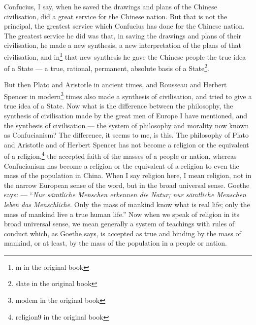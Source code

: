 Confucius, I say, when he saved the drawings and plans of the Chinese civilisation, did a great service for the Chinese nation.
But that is not the principal, the greatest service which Confucius has done for the Chinese nation.
The greatest service he did was that, in saving the drawings and plans of their civilisation, he made a new synthesis, a new interpretation of the plans of that civilisation, and in\footnote{m in the original book} that new synthesis he gave the Chinese people the true idea of a State --- a true, rational, permanent, absolute basis of a State\footnote{slate in the original book}.

But then Plato  and Aristotle  in ancient times, and Rousseau  and Herbert Spencer   in modern\footnote{modem in the original book} times also made a synthesis of civilisation, and tried to give a true idea of a State.
Now what is the difference between the philosophy, the synthesis of civilisation made by the great men of Europe I have mentioned, and the synthesis of civilisation --- the system of philosophy and morality now known as Confucianism?
The difference, it seems to me, is this.
The philosophy of Plato and Aristotle and of Herbert Spencer has not become a religion or the equivalent of a religion,\footnote{religion9 in the original book} the accepted faith of the masses of a people or nation, whereas Confucianism has become a religion or the equivalent of a religion to even the mass of the population in China.
When I say religion here, I mean religion, not in the narrow European sense of the word, but in the broad universal sense.
Goethe says: --- ``\emph{Nur s\"amtliche Menschen erkennen die Natur; nur s\"amtliche Menschen leben das Menschliche}. Only the mass of mankind know what is real life; only the mass of mankind live a true human life.\cite{num13}''
Now when we speak of religion in its broad universal sense, we mean generally a system of teachings with rules of conduct which, as Goethe says, is accepted as true and binding by the mass of mankind, or at least, by the mass of the population in a people or nation.
